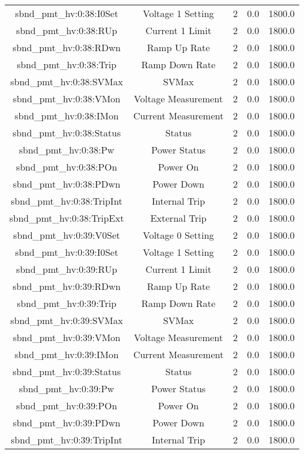 \begin{table}[ptb]
\begin{tabular}{c | c c c c}
sbnd_pmt_hv:0:38:I0Set & Voltage 1 Setting & 2 & 0.0 & 1800.0\\ 
sbnd_pmt_hv:0:38:RUp & Current 1 Limit & 2 & 0.0 & 1800.0\\ 
sbnd_pmt_hv:0:38:RDwn & Ramp Up Rate & 2 & 0.0 & 1800.0\\ 
sbnd_pmt_hv:0:38:Trip & Ramp Down Rate & 2 & 0.0 & 1800.0\\ 
sbnd_pmt_hv:0:38:SVMax & SVMax & 2 & 0.0 & 1800.0\\ 
sbnd_pmt_hv:0:38:VMon & Voltage Measurement & 2 & 0.0 & 1800.0\\ 
sbnd_pmt_hv:0:38:IMon & Current Measurement & 2 & 0.0 & 1800.0\\ 
sbnd_pmt_hv:0:38:Status & Status & 2 & 0.0 & 1800.0\\ 
sbnd_pmt_hv:0:38:Pw & Power Status & 2 & 0.0 & 1800.0\\ 
sbnd_pmt_hv:0:38:POn & Power On & 2 & 0.0 & 1800.0\\ 
sbnd_pmt_hv:0:38:PDwn & Power Down & 2 & 0.0 & 1800.0\\ 
sbnd_pmt_hv:0:38:TripInt & Internal Trip & 2 & 0.0 & 1800.0\\ 
sbnd_pmt_hv:0:38:TripExt & External Trip & 2 & 0.0 & 1800.0\\ 
sbnd_pmt_hv:0:39:V0Set & Voltage 0 Setting & 2 & 0.0 & 1800.0\\ 
sbnd_pmt_hv:0:39:I0Set & Voltage 1 Setting & 2 & 0.0 & 1800.0\\ 
sbnd_pmt_hv:0:39:RUp & Current 1 Limit & 2 & 0.0 & 1800.0\\ 
sbnd_pmt_hv:0:39:RDwn & Ramp Up Rate & 2 & 0.0 & 1800.0\\ 
sbnd_pmt_hv:0:39:Trip & Ramp Down Rate & 2 & 0.0 & 1800.0\\ 
sbnd_pmt_hv:0:39:SVMax & SVMax & 2 & 0.0 & 1800.0\\ 
sbnd_pmt_hv:0:39:VMon & Voltage Measurement & 2 & 0.0 & 1800.0\\ 
sbnd_pmt_hv:0:39:IMon & Current Measurement & 2 & 0.0 & 1800.0\\ 
sbnd_pmt_hv:0:39:Status & Status & 2 & 0.0 & 1800.0\\ 
sbnd_pmt_hv:0:39:Pw & Power Status & 2 & 0.0 & 1800.0\\ 
sbnd_pmt_hv:0:39:POn & Power On & 2 & 0.0 & 1800.0\\ 
sbnd_pmt_hv:0:39:PDwn & Power Down & 2 & 0.0 & 1800.0\\ 
sbnd_pmt_hv:0:39:TripInt & Internal Trip & 2 & 0.0 & 1800.0\\ 

\end{tabular}
\end{table}
